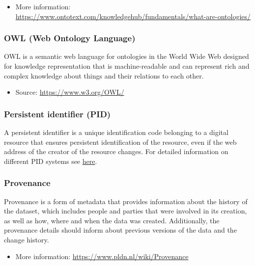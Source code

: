 \documentclass[
]{book}
\providecommand{\tightlist}{%
  \setlength{\itemsep}{0pt}\setlength{\parskip}{0pt}}
\begin{document}
\begin{itemize}
\tightlist
\item
  More information: \url{https://www.ontotext.com/knowledgehub/fundamentals/what-are-ontologies/}
\end{itemize}

\hypertarget{OWL}{%
\subsubsection*{OWL (Web Ontology Language)}\label{OWL}}

OWL is a semantic web language for ontologies in the World Wide Web designed for knowledge representation that is machine-readable and can represent rich and complex knowledge about things and their relations to each other.

\begin{itemize}
\tightlist
\item
  Source: \url{https://www.w3.org/OWL/}
\end{itemize}

\hypertarget{PID}{%
\subsubsection*{Persistent identifier (PID)}\label{PID}}

A persistent identifier is a unique identification code belonging to a digital resource that ensures persistent identification of the resource, even if the web address of the creator of the resource changes. For detailed information on different PID systems see \href{https://www.pidwijzer.nl/en}{here}.

\hypertarget{provenance}{%
\subsubsection*{Provenance}\label{provenance}}

Provenance is a form of metadata that provides information about the history of the dataset, which includes people and parties that were involved in its creation, as well as how, where and when the data was created. Additionally, the provenance details should inform about previous versions of the data and the change history.

\begin{itemize}
\tightlist
\item
  More information: \url{https://www.pldn.nl/wiki/Provenance}
\end{itemize}
\end{document}
